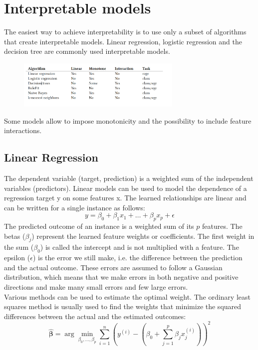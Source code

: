 \section{Interpretable models}
The easiest way to achieve interpretability is to use only a subset of algorithms that create interpretable models.
Linear regression, logistic regression and the decision tree are commonly used interpretable models.
\begin{figure}[H]
    \includegraphics[width=0.7\textwidth]{img/int_models.png}
    \centering
\end{figure}
Some models allow to impose monotonicity and the possibility to include feature interactions.

\subsection{Linear Regression}
The dependent variable (target, prediction) is a weighted sum of the independent variables (predictors).
Linear models can be used to model the dependence of a regression target y on some features x. The learned relationships are linear and can be written for a single instance as follows:
\begin{equation}
    y=\beta_0+\beta_1x_1+\ldots+\beta_px_p+\epsilon
\end{equation}
The predicted outcome of an instance is a weighted sum of its $p$ features.
The betas ($\beta_j$) represent the learned feature weights or coefficients. 
The first weight in the sum ($\beta_0$) is called the intercept and is not multiplied with a feature.
The epsilon ($\epsilon$) is the error we still make, i.e. the difference between the prediction and the actual outcome. 
These errors are assumed to follow a Gaussian distribution, which means that we make errors in both negative and positive directions and make many small errors and few large errors.\\

Various methods can be used to estimate the optimal weight. The ordinary least squares method is usually used to find the weights that minimize the squared differences between the actual and the estimated outcomes:
\begin{equation}
    \hat{\boldsymbol{\beta}}=\arg\!\min_{\beta_0,\ldots,\beta_p}\sum_{i=1}^n\left(y^{(i)}-\left(\beta_0+\sum_{j=1}^p\beta_jx^{(i)}_{j}\right)\right)^{2}
\end{equation}

